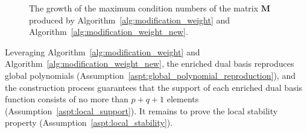 \begin{figure}[ht]
	\center
	\caption{The growth of the maximum condition numbers of the matrix $\mathbf{M}$ produced by Algorithm~\ref{alg:modification_weight} and Algorithm~\ref{alg:modification_weight_new}.}
	\label{fig:condition_number}
\end{figure}

Leveraging Algorithm~\ref{alg:modification_weight} and Algorithm~\ref{alg:modification_weight_new}, the enriched dual basis reproduces global polynomials (Assumption~\ref{aspt:global_polynomial_reproduction}), and the construction process guarantees that the support of each enriched dual basis function consists of no more than $p+q+1$ elements (Assumption~\ref{aspt:local_support}). It remains to prove the local stability property (Assumption~\ref{aspt:local_stability}).

